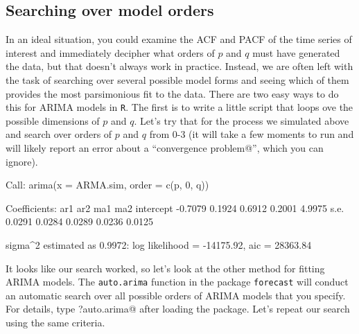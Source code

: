 \subsection{Searching over model orders}

In an ideal situation, you could examine the ACF and PACF of the time series of interest and immediately decipher what orders of $p$ and $q$ must have generated the data, but that doesn't always work in practice.  Instead, we are often left with the task of searching over several possible model forms and seeing which of them provides the most parsimonious fit to the data.  There are two easy ways to do this for ARIMA models in \texttt{R}.  The first is to write a little script that loops ove the possible dimensions of $p$ and $q$.  Let's try that for the process we simulated above and search over orders of $p$ and $q$ from 0-3 (it will take a few moments to run and will likely report an error about a ``\verb@possible convergence problem@'', which you can ignore).

\begin{Schunk}
\begin{Soutput}
Call:
arima(x = ARMA.sim, order = c(p, 0, q))

Coefficients:
          ar1     ar2     ma1     ma2  intercept
      -0.7079  0.1924  0.6912  0.2001     4.9975
s.e.   0.0291  0.0284  0.0289  0.0236     0.0125

sigma^2 estimated as 0.9972:  log likelihood = -14175.92,  aic = 28363.84
\end{Soutput}
\end{Schunk}

It looks like our search worked, so let's look at the other method for fitting ARIMA models.  The \texttt{auto.arima} function in the package \texttt{forecast} will conduct an automatic search over all possible orders of ARIMA models that you specify.  For details, type \verb@?auto.arima@ after loading the package.  Let's repeat our search using the same criteria.

